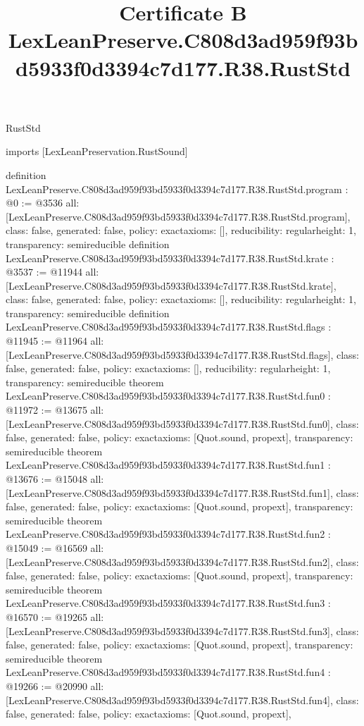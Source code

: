 \begin{lexlean}{RustStd}
\title{Certificate B LexLeanPreserve.C808d3ad959f93bd5933f0d3394c7d177.R38.RustStd}
\begin{coremodule}
imports [LexLeanPreservation.RustSound]

definition LexLeanPreserve.C808d3ad959f93bd5933f0d3394c7d177.R38.RustStd.program : @0 := @3536 {
  all: [LexLeanPreserve.C808d3ad959f93bd5933f0d3394c7d177.R38.RustStd.program],
  class: false,
  generated: false,
  policy: exact{axioms: []},
  reducibility: regular{height: 1},
  transparency: semireducible
}
definition LexLeanPreserve.C808d3ad959f93bd5933f0d3394c7d177.R38.RustStd.krate : @3537 := @11944 {
  all: [LexLeanPreserve.C808d3ad959f93bd5933f0d3394c7d177.R38.RustStd.krate],
  class: false,
  generated: false,
  policy: exact{axioms: []},
  reducibility: regular{height: 1},
  transparency: semireducible
}
definition LexLeanPreserve.C808d3ad959f93bd5933f0d3394c7d177.R38.RustStd.flags : @11945 := @11964 {
  all: [LexLeanPreserve.C808d3ad959f93bd5933f0d3394c7d177.R38.RustStd.flags],
  class: false,
  generated: false,
  policy: exact{axioms: []},
  reducibility: regular{height: 1},
  transparency: semireducible
}
theorem LexLeanPreserve.C808d3ad959f93bd5933f0d3394c7d177.R38.RustStd.fun0 : @11972 := @13675 {
  all: [LexLeanPreserve.C808d3ad959f93bd5933f0d3394c7d177.R38.RustStd.fun0],
  class: false,
  generated: false,
  policy: exact{axioms: [Quot.sound, propext]},
  transparency: semireducible
}
theorem LexLeanPreserve.C808d3ad959f93bd5933f0d3394c7d177.R38.RustStd.fun1 : @13676 := @15048 {
  all: [LexLeanPreserve.C808d3ad959f93bd5933f0d3394c7d177.R38.RustStd.fun1],
  class: false,
  generated: false,
  policy: exact{axioms: [Quot.sound, propext]},
  transparency: semireducible
}
theorem LexLeanPreserve.C808d3ad959f93bd5933f0d3394c7d177.R38.RustStd.fun2 : @15049 := @16569 {
  all: [LexLeanPreserve.C808d3ad959f93bd5933f0d3394c7d177.R38.RustStd.fun2],
  class: false,
  generated: false,
  policy: exact{axioms: [Quot.sound, propext]},
  transparency: semireducible
}
theorem LexLeanPreserve.C808d3ad959f93bd5933f0d3394c7d177.R38.RustStd.fun3 : @16570 := @19265 {
  all: [LexLeanPreserve.C808d3ad959f93bd5933f0d3394c7d177.R38.RustStd.fun3],
  class: false,
  generated: false,
  policy: exact{axioms: [Quot.sound, propext]},
  transparency: semireducible
}
theorem LexLeanPreserve.C808d3ad959f93bd5933f0d3394c7d177.R38.RustStd.fun4 : @19266 := @20990 {
  all: [LexLeanPreserve.C808d3ad959f93bd5933f0d3394c7d177.R38.RustStd.fun4],
  class: false,
  generated: false,
  policy: exact{axioms: [Quot.sound, propext]},
}
\end{coremodule}
\end{lexlean}
